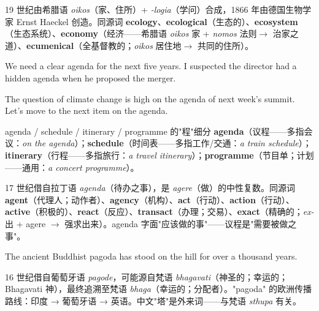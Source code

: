 \documentclass[../main.tex]{subfiles}
\begin{document}
\begin{origin}
19 世纪由希腊语 \textit{oikos}（家、住所）+ \textit{-logia}（学问）合成，1866 年由德国生物学家 Ernst Haeckel 创造。同源词 \textbf{ecology}、\textbf{ecological}（生态的）、\textbf{ecosystem}（生态系统）、\textbf{economy}（经济——希腊语 \textit{oikos} 家 + \textit{nomos} 法则$\to$ 治家之道）、\textbf{ecumenical}（全基督教的；\textit{oikos} 居住地$\to$ 共同的住所）。
\end{origin}


{We need a clear agenda for the next five years.}
{I suspected the director had a hidden agenda when he proposed the merger.}

{The question of climate change is high on the agenda of next week's summit.}
{Let's move to the next item on the agenda.}

\begin{gram}{agenda / schedule / itinerary / programme 的"程"细分}
\textbf{agenda}（议程——多指会议：\textit{on the agenda}）；\textbf{schedule}（时间表——多指工作/交通：\textit{a train schedule}）；\textbf{itinerary}（行程——多指旅行：\textit{a travel itinerary}）；\textbf{programme}（节目单；计划——通用：\textit{a concert programme}）。
\end{gram}

\begin{origin}
17 世纪借自拉丁语 \textit{agenda}（待办之事），是 \textit{agere}（做）的中性复数。同源词 \textbf{agent}（代理人；动作者）、\textbf{agency}（机构）、\textbf{act}（行动）、\textbf{action}（行动）、\textbf{active}（积极的）、\textbf{react}（反应）、\textbf{transact}（办理；交易）、\textbf{exact}（精确的；\textit{ex-} 出 + agere $\to$ 强求出来）。agenda 字面"应该做的事"——议程是"需要被做之事"。
\end{origin}


{The ancient Buddhist pagoda has stood on the hill for over a thousand years.}

\begin{origin}
16 世纪借自葡萄牙语 \textit{pagode}，可能源自梵语 \textit{bhagavati}（神圣的；幸运的；Bhagavati 神），最终追溯至梵语 \textit{bhaga}（幸运的；分配者）。"pagoda" 的欧洲传播路线：印度 → 葡萄牙语 → 英语。中文"塔"是外来词——与梵语 \textit{sthupa} 有关。
\end{origin}
\end{document}
